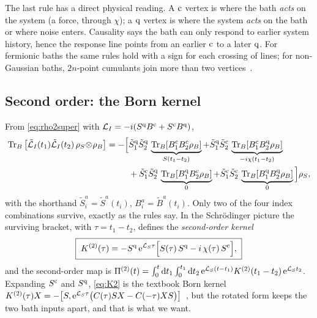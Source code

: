 The last rule has a direct physical reading.
A $\mathrm{c}$ vertex is where the bath \emph{acts} on the system (a force, through $\chi$); a $\mathrm{q}$ vertex is where the system \emph{acts} on the bath or where noise enters.
Causality says the bath can only respond to earlier system history, hence the response line points from an earlier $\mathrm{c}$ to a later $\mathrm{q}$.
For fermionic baths the same rules hold with a sign for each crossing of lines; for non-Gaussian baths, $2n$-point cumulants join more than two vertices~\cite{Schoeller2009}.

\subsection{Second order: the Born kernel}

\begin{exbox}
From \cref{eq:rho2super} with $\mathcal{L}_I=-i(S^{\mathrm{q}} B^{\mathrm{c}}+S^{\mathrm{c}} B^{\mathrm{q}})$,
\begin{align}
  \operatorname{Tr}_B\big[\tilde{\mathcal{L}}_I(t_1)\tilde{\mathcal{L}}_I(t_2)\,\rho_S\!\otimes\!\rho_{B}\big]
  =-\Big[&\tilde S^{\mathrm{q}}_1\tilde S^{\mathrm{q}}_2\,\underbrace{\operatorname{Tr}_B[B^{\mathrm{c}}_1B^{\mathrm{c}}_2\rho_{B}]}_{S(t_1-t_2)}
   +\tilde S^{\mathrm{q}}_1\tilde S^{\mathrm{c}}_2\,\underbrace{\operatorname{Tr}_B[B^{\mathrm{c}}_1B^{\mathrm{q}}_2\rho_{B}]}_{-i\chi(t_1-t_2)}\notag\\
   &+\tilde S^{\mathrm{c}}_1\tilde S^{\mathrm{q}}_2\,\underbrace{\operatorname{Tr}_B[B^{\mathrm{q}}_1B^{\mathrm{c}}_2\rho_{B}]}_{0}
   +\tilde S^{\mathrm{c}}_1\tilde S^{\mathrm{c}}_2\,\underbrace{\operatorname{Tr}_B[B^{\mathrm{q}}_1B^{\mathrm{q}}_2\rho_{B}]}_{0}\Big]\rho_S ,
\end{align}
with the shorthand $\tilde S^{a}_i=\tilde S^{a}(t_i)$, $B^{a}_i=\tilde B^{a}(t_i)$.
Only two of the four index combinations survive, exactly as the rules say.
In the Schr\"odinger picture the surviving bracket, with $\tau=t_1-t_2$, defines the \emph{second-order kernel}
\begin{equation}
  \boxed{\;K^{(2)}(\tau)=-S^{\mathrm{q}}\,\mathrm{e}^{\mathcal{L}_S\tau}\Big[S(\tau)\,S^{\mathrm{q}}-i\,\chi(\tau)\,S^{\mathrm{c}}\Big],\;}
  \label{eq:K2}
\end{equation}
and the second-order map is $\Pi^{(2)}(t)=\int_0^t\mathrm{d} t_1\int_0^{t_1}\mathrm{d} t_2\,\mathrm{e}^{\mathcal{L}_S(t-t_1)}K^{(2)}(t_1-t_2)\,\mathrm{e}^{\mathcal{L}_St_2}$.
Expanding $S^{\mathrm{c}}$ and $S^{\mathrm{q}}$, \cref{eq:K2} is the textbook Born kernel $K^{(2)}(\tau)X=-\big[S,\mathrm{e}^{\mathcal{L}_S\tau}\big(C(\tau)SX-C(-\tau)XS\big)\big]$~\cite[Sec.~3.3.1]{BreuerPetruccione}, but the rotated form keeps the two bath inputs apart, and that is what we want.
\end{exbox}

